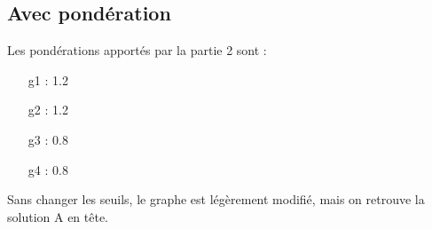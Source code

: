 \subsection{Avec pondération}

Les pondérations apportés par la partie 2 sont :
\begin{itemize}
\item[g1] : 1.2
\item[g2] : 1.2
\item[g3] : 0.8
\item[g4] : 0.8
\end{itemize}

Sans changer les seuils, le graphe est légèrement modifié, mais on retrouve la solution A en tête.
